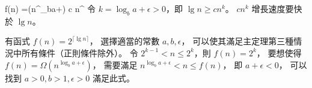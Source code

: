 \startformula\startmathalignment
\NC f(n) \NC =\Omega(n^{\log_b{a+\epsilon}}) \NR
\NC \NC \ge c n^{\lg\epsilon} \NR
\stopmathalignment\stopformula
令 $k=\log_b{a+\epsilon}>0$，即 $\lg n \ge c n^k$。
 $cn^k$ 增長速度要快於 $\lg n$。
\stopANSWER

\startEXERCISE
有函式 $f(n)=2^{\lceil \lg n\rceil}$，
選擇適當的常數 $a,b,\epsilon$，
可以使其滿足主定理第三種情況中所有條件（正則條件除外）。
\stopEXERCISE
\startANSWER
令 $2^{k-1}< n\le 2^{k}$，則 $f(n)=2^k$，
要想使得 $f(n)=\Omega(n^{\log_b{a+\epsilon}})$，
需要滿足 $n^{\log_b{a+\epsilon}} < n\le f(n)$，
即 $a+\epsilon < 0$，
可以找到 $a>0,b>1,\epsilon>0$ 滿足此式。
\stopANSWER

\stopsection
